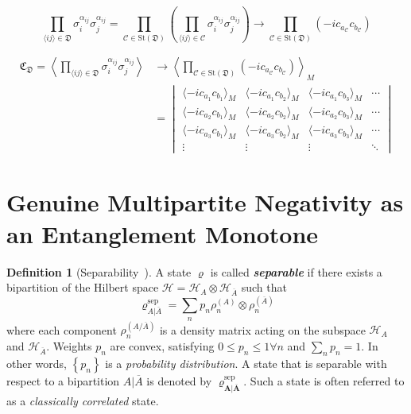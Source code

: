 \documentclass[12font]{article}
\numberwithin{equation}{section}    %
\theoremstyle{definition}
\newtheorem{definition}{Definition}[section]
\newcommand{\anglelr}[1]{\langle #1 \rangle}
\newcommand{\Anglelr}[1]{\left\langle #1 \right\rangle}
\newcommand{\lr}[1]{\left(  #1  \right)}
\newcommand{\lrg}[1]{\left\{  #1  \right\}}
\newcommand{\mrm}[1]{\mathrm{#1}}
\newcommand{\bog}[1]{\boldsymbol{#1}}
\newcommand{\tcor}[2]{\langle -ic_{#1}c_{#2} \rangle_M}
\newcommand{\dimer}[2]{\sigma_{#1}^{\alpha_{#1#2}}\sigma_{#2}^{\alpha_{#1#2}}}
\begin{document}
\begin{equation}
    \prod_{\anglelr{ij}\in\mathfrak{D}}
    \dimer{i}{j}
    =
    \prod_{\mathcal{C} \in \mrm{St}(\mathfrak{D})}
    \lr{
        \prod_{\anglelr{ij}\in\mathcal{C}}
        \dimer{i}{j}
    }
    \to 
    \prod_{\mathcal{C} \in \mrm{St}(\mathfrak{D})} 
    \lr{-i c_{a_{\mathcal{C}}}c_{b_{\mathcal{C}}} }
\end{equation}

\begin{align}\label{eq:multi-correlation}
    \mathfrak{C}_{\mathfrak{D}}
    =
    \Anglelr{\prod_{\anglelr{ij}\in\mathfrak{D}}
    \dimer{i}{j}}
    &\to
    \Anglelr{
    \prod_{\mathcal{C} \in \mrm{St}(\mathfrak{D})} 
        \lr{-i c_{a_{\mathcal{C}}}c_{b_{\mathcal{C}}} }
    }_M \nonumber \\
    &=
    \begin{vmatrix}
        \tcor{a_1}{b_1} & \tcor{a_1}{b_2} & \tcor{a_1}{b_3} & \cdots \\
        \tcor{a_2}{b_1} & \tcor{a_2}{b_2} & \tcor{a_2}{b_3} & \cdots \\
        \tcor{a_3}{b_1} & \tcor{a_3}{b_2} & \tcor{a_3}{b_3} & \cdots \\
        \vdots & \vdots & \vdots & \ddots
    \end{vmatrix}
\end{align}

\section{Genuine Multipartite Negativity as an Entanglement Monotone}


\begin{definition}[Separability~\cite{Guhne-Toth_2009}]\label{def:sep}
    A state $\varrho$ is called \textbf{\textit{separable}} if there exists a bipartition of the Hilbert space $\mathcal{H} = \mathcal{H}_A\otimes\mathcal{H}_{\overline{A}}$ such that
    \begin{equation}\label{eq:sep-def}
        \varrho^{\mrm{sep}}_{A|\overline{A}} = \sum_{n} p_n \rho^{(A)}_n
        \otimes \rho^{(\overline{A})}_n
    \end{equation}
    where each component $\rho^{(A/\overline{A})}_n$ is a density matrix acting on the subspace $\mathcal{H}_A$ and $\mathcal{H}_{\overline{A}}$. Weights $p_n$ are convex, satisfying $0\leq p_n\leq 1\forall n$ and $\sum_{n}p_n = 1$. In other words, $\lrg{p_n}$ is a \textit{probability distribution}. A state that is separable with respect to a bipartition $A|\overline{A}$ is denoted by $\bog{\varrho^{\mrm{sep}}_{A|\overline{A}}}$. Such a state is often referred to as a \textit{classically correlated} state.
\end{definition}
\end{document}
